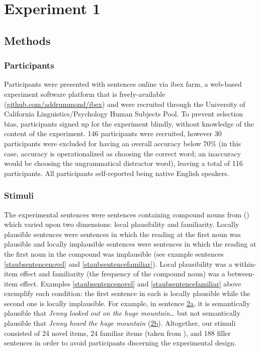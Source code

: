 \documentclass[
  12pt,
  letterpaper,
]{scrreprt}
\begin{document}
\section{Experiment 1}\label{experiment-1}

\subsection{Methods}\label{methods}

\subsubsection{Participants}\label{participants}

Participants were presented with sentences online via ibex farm, a
web-based experiment software platform that is freely-available
(\url{github.com/addrummond/ibex}) and were recruited through the
University of California Linguistics/Psychology Human Subjects Pool. To
prevent selection bias, participants signed up for the experiment
blindly, without knowledge of the content of the experiment. 146
participants were recruited, however 30 participants were excluded for
having an overall accuracy below 70\% (in this case, accuracy is
operationalized as choosing the correct word; an inaccuracy would be
choosing the ungrammatical distractor word), leaving a total of 116
participants. All participants self-reported being native English
speakers.

\subsubsection{Stimuli}\label{stimuli}

The experimental sentences were sentences containing compound nouns from
()
which varied upon two dimensions: local plausibility and familiarity.
Locally plausible sentences were sentences in which the reading at the
first noun was plausible and locally implausible sentences were
sentences in which the reading at the first noun in the compound was
implausible (see example sentences \ref{staubsentencenovel} and
\ref{staubsentencefamiliar}). Local plausibility was a within-item
effect and familiarity (the frequency of the compound noun) was a
between-item effect. Examples \ref{staubsentencenovel} and
\ref{staubsentencefamiliar} above exemplify each condition: the first
sentence in each is locally plausible while the second one is locally
implausible. For example, in sentence
\hyperref[staubsentencefamiliar]{2a}, it is semantically plausible that
\emph{Jenny looked out on the huge mountain\ldots{}} but not
semantically plausible that \emph{Jenny heard the huge mountain}
(\hyperref[staubsentencefamiliar]{2b}). Altogether, our stimuli
consisted of 24 novel items, 24 familiar items (taken from
), and
188 filler sentences in order to avoid participants discerning the
experimental design.
\end{document}

